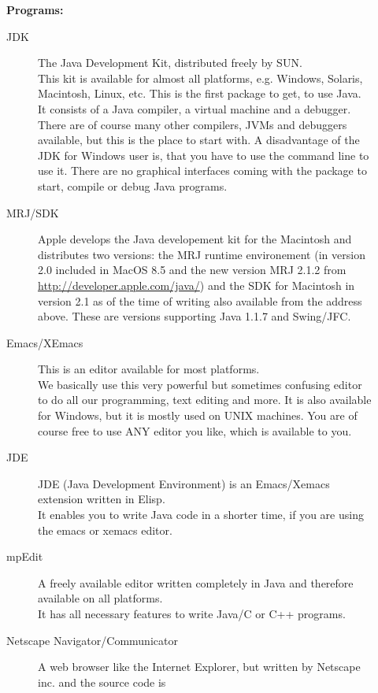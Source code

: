 \begin{description}
\item[] \textbf{Programs:} 
\begin{description}
\item[JDK] The Java Development Kit, distributed freely by SUN.\\
        This kit is available for almost all platforms, e.g. Windows,
        Solaris, Macintosh, Linux, etc. This is the first package to get,
        to use Java. It consists of a Java compiler, a virtual machine 
        and a debugger. There
        are of course many other compilers, JVMs and debuggers
        available, but this is the place to start with. A disadvantage
        of the JDK for Windows user is, that you have to use the
        command line to use it. There are no graphical interfaces  coming with the
        package to start, compile or debug Java programs.
\item[MRJ/SDK] Apple develops the Java developement kit for the Macintosh and
  distributes two versions: the MRJ runtime environement (in version 2.0 included
  in MacOS 8.5 and the new version MRJ 2.1.2 from \href{http://developer.apple.com/java/}%
  {http://developer.apple.com/java/}) and the SDK for Macintosh in version
  2.1 as of the time of writing also available from the address above. These are
  versions supporting Java 1.1.7 and Swing/JFC. 
\item[Emacs/XEmacs] This is an editor available for most platforms.\\
        We basically use this very powerful but sometimes confusing
        editor to do all our programming, text editing and more. It is
        also available for Windows, but it is mostly used on UNIX machines.
        You are of course free to use ANY editor you like, which is available
        to you. 
\item[JDE] JDE (Java Development Environment) is an Emacs/Xemacs extension
        written in Elisp. \\
        It enables you to write Java code in a shorter time, if you are
        using the emacs or xemacs editor. 
\item[mpEdit] A freely available editor written completely in Java and
  therefore available on all platforms.\\ 
  It has all necessary features to write Java/C or C++ programs.
\item[Netscape Navigator/Communicator] A web browser like the Internet 
        Explorer, but written by Netscape inc. and the source code is

\end{description}
\end{description}
